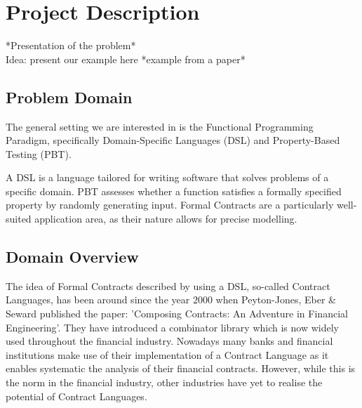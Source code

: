 \documentclass{ituthesis}
\begin{document}
\section{Project Description}
*Presentation of the problem*\\
Idea: present our example here
*example from a paper*

\subsection{Problem Domain}
The general setting we are interested in is the Functional Programming Paradigm, specifically Domain-Specific Languages (DSL) and Property-Based Testing (PBT).\par
A DSL is a language tailored for writing software that solves problems of a specific domain. PBT assesses whether a function satisfies a formally specified property by randomly generating input.
Formal Contracts are a particularly well-suited application area, as their nature allows for precise modelling.


\subsection{Domain Overview}
The idea of Formal Contracts described by using a DSL, so-called Contract Languages, has been around since the year $2000$ when Peyton-Jones, Eber \& Seward published the paper: 'Composing Contracts: An Adventure in Financial Engineering'. They have introduced a combinator library which is now widely used throughout the financial industry. Nowadays many banks and financial institutions make use of their implementation of a Contract Language as it enables systematic the analysis of their financial contracts. However, while this is the norm in the financial industry, other industries have yet to realise the potential of Contract Languages.
\end{document}
